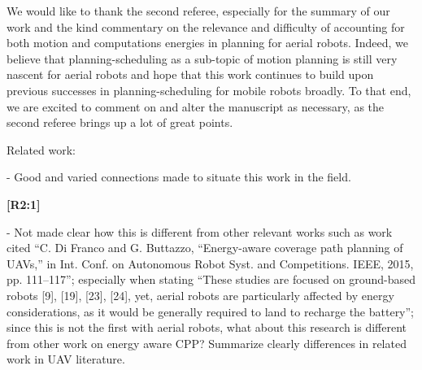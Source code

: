 \documentclass[10pt]{letter}
\begin{document}
{\color{blue} 


{\hspace*{-4.5em}{[R2]}\vspace*{-1.9em}}

We would like to thank the second referee, especially for the summary of our work and the kind commentary on the relevance and difficulty of accounting for both motion and computations energies in planning for aerial robots. Indeed, we believe that planning-scheduling as a sub-topic of motion planning is still very nascent for aerial robots and hope that this work continues to build upon previous successes in planning-scheduling for mobile robots broadly. To that end, we are excited to comment on and alter the manuscript as necessary, as the second referee brings up a lot of great points.


}

\vspace{2em}

Related work:

- Good and varied connections made to situate this work in the field. 

{\hspace*{-4.5em}\textbf{[R2:1]}\vspace*{-1.9em}}

- Not made clear how this is different from other relevant works such as work cited ``C. Di Franco and G. Buttazzo, ``Energy-aware coverage path planning of UAVs,'' in Int. Conf. on Autonomous Robot Syst. and Competitions. IEEE, 2015, pp. 111–117''; especially when stating ``These studies are focused on ground-based robots [9], [19], [23], [24], yet, aerial robots are particularly affected by energy considerations, as it would be generally required to land to recharge the battery''; since this is not the first with aerial robots, what about this research is different from other work on energy aware CPP? Summarize clearly differences in related work in UAV literature.
\end{document}
